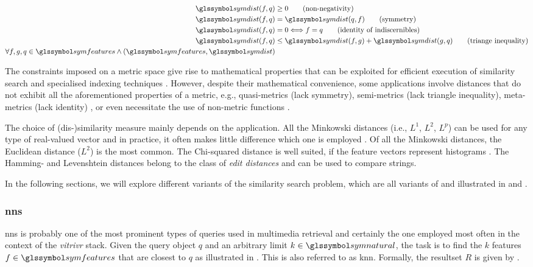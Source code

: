\begin{align}
  \label{eq:metric}
   \symdist(f,q) &\geq 0                           \tag{non-negativity} \\
   \symdist(f,q) &= \symdist(q,f)                    \tag{symmetry}\\
   \symdist(f,q) &= 0 \Longleftrightarrow f = q    \tag{identity of indiscernibles}\\
   \symdist(f,q) &\leq  \symdist(f,g) +  \symdist(g,q)   \tag{triange inequality}\\
   \forall f,g,q \in \symfeatures \wedge (\symfeatures, \symdist) \nonumber
\end{align}

The constraints imposed on a metric space give rise to mathematical properties that can be exploited for efficient execution of similarity search and specialised indexing techniques \cite{Zezula:2006Similarity}. However, despite their mathematical convenience, some applications involve distances that do not exhibit all the aforementioned properties of a metric, e.g., quasi-metrics (lack symmetry), semi-metrics (lack triangle inequality), meta-metrics (lack identity) \cite{Zezula:2006Similarity}, or even necessitate the use of non-metric functions \cite{Skopal:2011Nonmetric}.

The choice of (dis-)similarity measure mainly depends on the application. All the Minkowski distances (i.e., $L^1$, $L^2$, $L^p$) can be used for any type of real-valued vector and in practice, it often makes little difference which one is employed \cite{Rossetto:2018Multi}. Of all the Minkowski distances, the Euclidean distance ($L^2$) is the most common. The Chi-squared distance is well suited, if the feature vectors represent histograms \cite{Pele:2010Quadratic}. The Hamming- and Levenshtein distances belong to the class of \emph{edit distances} and can be used to compare strings.

In the following sections, we will explore different variants of the similarity search problem, which are all variants of  and illustrated in  and .

\subsubsection{\texorpdfstring{\acrfull{nns}}{Nearest Neighbour Search (NNS)}}

\acrshort{nns} is probably one of the most prominent types of queries used in multimedia retrieval and certainly the one employed most often in the context of the \emph{vitrivr} \cite{Rossetto:2016Vitrivr,Gasser:2019Multimodal} stack. Given the query object $q$ and an arbitrary limit $k \in \symnatural$, the task is to find the $k$ features $f \in \symfeatures$ that are closest to $q$ as illustrated in . This is also referred to as \acrfull{knn}. Formally, the resultset $R$ is given by .

